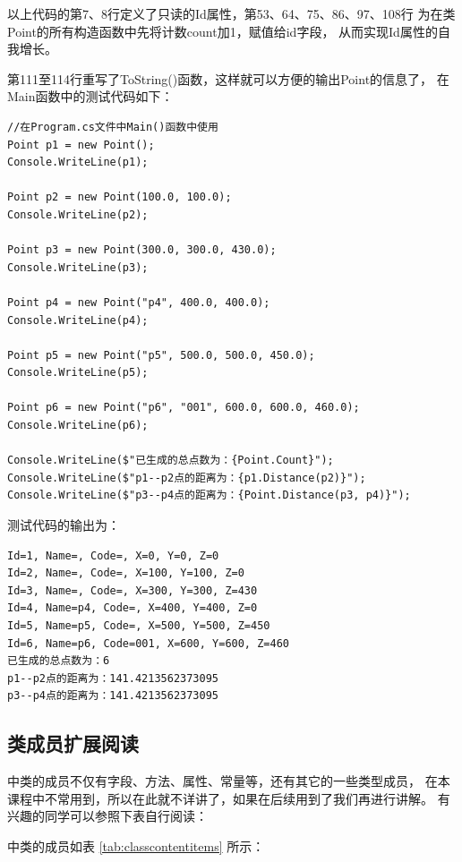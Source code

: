 以上代码的第7、8行定义了只读的Id属性，第53、64、75、86、97、108行
为在类Point的所有构造函数中先将计数count加1，赋值给id字段，
从而实现Id属性的自我增长。

第111至114行重写了ToString()函数，这样就可以方便的输出Point的信息了，
在Main函数中的测试代码如下：

\begin{lstlisting}
//在Program.cs文件中Main()函数中使用
Point p1 = new Point();
Console.WriteLine(p1);

Point p2 = new Point(100.0, 100.0);
Console.WriteLine(p2);

Point p3 = new Point(300.0, 300.0, 430.0);
Console.WriteLine(p3);

Point p4 = new Point("p4", 400.0, 400.0);
Console.WriteLine(p4);

Point p5 = new Point("p5", 500.0, 500.0, 450.0);
Console.WriteLine(p5);

Point p6 = new Point("p6", "001", 600.0, 600.0, 460.0);
Console.WriteLine(p6);

Console.WriteLine($"已生成的总点数为：{Point.Count}"); 
Console.WriteLine($"p1--p2点的距离为：{p1.Distance(p2)}"); 
Console.WriteLine($"p3--p4点的距离为：{Point.Distance(p3, p4)}"); 
\end{lstlisting}

测试代码的输出为：
\begin{verbatim}
Id=1, Name=, Code=, X=0, Y=0, Z=0
Id=2, Name=, Code=, X=100, Y=100, Z=0
Id=3, Name=, Code=, X=300, Y=300, Z=430
Id=4, Name=p4, Code=, X=400, Y=400, Z=0
Id=5, Name=p5, Code=, X=500, Y=500, Z=450
Id=6, Name=p6, Code=001, X=600, Y=600, Z=460
已生成的总点数为：6
p1--p2点的距离为：141.4213562373095
p3--p4点的距离为：141.4213562373095
\end{verbatim}


\subsection{类成员扩展阅读}
\cs 中类的成员不仅有字段、方法、属性、常量等，还有其它的一些类型成员，
在本课程中不常用到，所以在此就不详讲了，如果在后续用到了我们再进行讲解。
有兴趣的同学可以参照下表自行阅读：

\cs 中类的成员如表 \ref{tab:classcontentitems} 所示：

